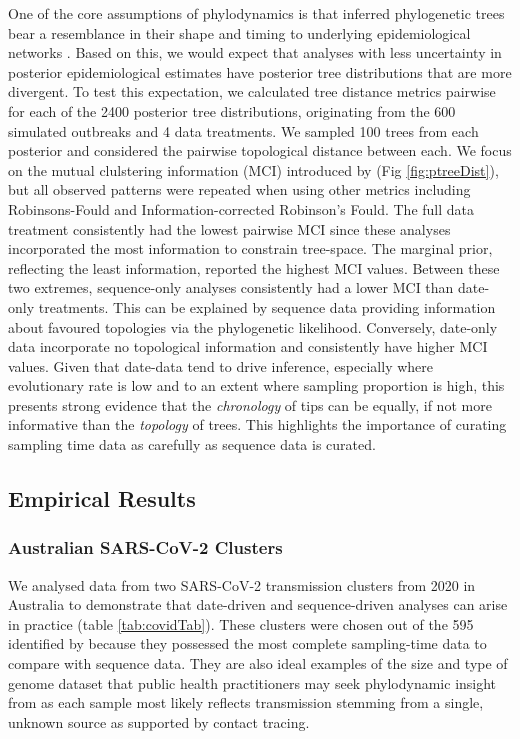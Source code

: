 \documentclass{article}
\begin{document}
One of the core assumptions of phylodynamics is that inferred phylogenetic trees bear a resemblance in their shape and timing to underlying epidemiological networks \citep{featherstone_epidemiological_2022}. Based on this, we would expect that analyses with less uncertainty in posterior epidemiological estimates have posterior tree distributions that are more divergent. To test this expectation, we calculated tree distance metrics pairwise for each of the 2400 posterior tree distributions, originating from the 600 simulated outbreaks and 4 data treatments. We sampled 100 trees from each posterior and considered the pairwise topological distance between each. We focus on the mutual clulstering information (MCI) introduced by \citet{smith_information_2020} (Fig \ref{fig:ptreeDist}), but all observed patterns were repeated when using other metrics including Robinsons-Fould and Information-corrected Robinson's Fould. The full data treatment consistently had the lowest pairwise MCI since these analyses incorporated the most information to constrain tree-space. The marginal prior, reflecting the least information, reported the highest MCI values. Between these two extremes, sequence-only analyses consistently had a lower MCI than date-only treatments. This can be explained by sequence data providing information about favoured topologies via the phylogenetic likelihood. Conversely, date-only data incorporate no topological information and consistently have higher MCI values. Given that date-data tend to drive inference, especially where evolutionary rate is low and to an extent where sampling proportion is high, this presents strong evidence that the \textit{chronology} of tips can be equally, if not more informative than the \textit{topology} of trees. This highlights the importance of curating sampling time data as carefully as sequence data is curated.

\subsection*{Empirical Results}
\subsubsection*{Australian SARS-CoV-2 Clusters}
We analysed data from two SARS-CoV-2 transmission clusters from 2020 in Australia to demonstrate that date-driven and sequence-driven analyses can arise in practice (table \ref{tab:covidTab}). These clusters were chosen out of the 595 identified by \citet{lane2021genomics} because they possessed the most complete sampling-time data to compare with sequence data. They are also ideal examples of the size and type of genome dataset that public health practitioners may seek phylodynamic insight from as each sample most likely reflects transmission stemming from a single, unknown source as supported by contact tracing.
\end{document}
